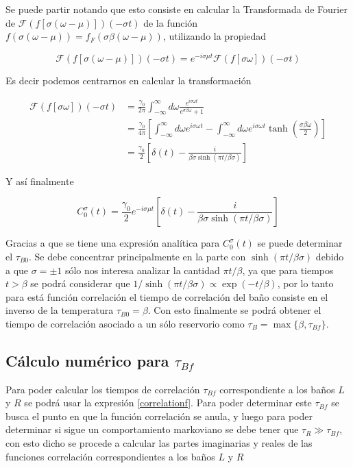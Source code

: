 \begin{appendixs}
Se puede partir notando que esto consiste en calcular la Transformada de Fourier de $\mathcal{F}(f[\sigma (\omega - \mu)])(-\sigma t)$ de la función $f(\sigma(\omega-\mu))= f_{F}(\sigma \beta (\omega-\mu) )$, utilizando la propiedad

\begin{equation*}
\mathcal{F}(f[\sigma (\omega - \mu)])(-\sigma t) = e^{-i \sigma \mu t}\mathcal{F}(f[\sigma \omega])(-\sigma t)
\end{equation*}

Es decir podemos centrarnos en calcular la transformación

\begin{align*}
    \mathcal{F}(f[\sigma \omega])(-\sigma t) &= \frac{\gamma_{0}}{2\pi} \int_{-\infty}^{\infty} d\omega \frac{e^{i\sigma \omega t}}{e^{\sigma \beta \omega} +1 } \\
        & = \frac{\gamma_{0}}{4\pi} \left[\int_{-\infty}^{\infty}d \omega e^{i\sigma \omega t} - \int_{-\infty}^{\infty}d\omega e^{i\sigma \omega t} \tanh \left(\frac{ \sigma \beta \omega }{2} \right)   \right] \\
        & =  \frac{\gamma_{0}}{2} \left[\delta(t) - \frac{i}{\beta \sigma \sinh(\pi t/\beta \sigma)} \right]
\end{align*}

Y así finalmente

\begin{equation*}
    C^{\sigma}_{0}(t) = \frac{\gamma_{0}}{2}e^{-i\sigma \mu t} \left[\delta(t) - \frac{i}{\beta \sigma \sinh(\pi t/\beta \sigma)} \right]
\end{equation*}

Gracias a que se tiene una expresión analítica para $C^{\sigma}_{0}(t)$ se puede determinar el $\tau_{B0}$. Se debe concentrar principalmente en la parte con $\sinh(\pi t/\beta \sigma)$ debido a que $\sigma=\pm 1$ sólo nos interesa analizar la cantidad $\pi t/\beta$, ya que para tiempos $t > \beta$ se podrá considerar que $1/\sinh(\pi t/\beta \sigma) \propto \exp(-t/\beta)$, por lo tanto para está función correlación el tiempo de correlación del baño consiste en el inverso de la temperatura $\tau_{B0} = \beta$. Con esto finalmente se podrá obtener el tiempo de correlación asociado a un sólo reservorio como $\tau_{B} = \max \{\beta,\tau_{Bf} \}$.  

\label{appendix5correlation}

\subsection{Cálculo numérico para $\tau_{Bf}$}
Para poder calcular los tiempos de correlación $\tau_{Bf}$ correspondiente a los baños $L$ y $R$ se podrá usar la expresión \ref{correlationf}. Para poder determinar este $\tau_{Bf}$ se busca el punto en que la función correlación se anula, y luego para poder determinar si sigue un comportamiento markoviano se debe tener que $\tau_{R}\gg \tau_{Bf}$, con esto dicho se procede a calcular las partes imaginarias y reales de las funciones correlación correspondientes a los baños $L$ y $R$ 


\end{appendixs}
